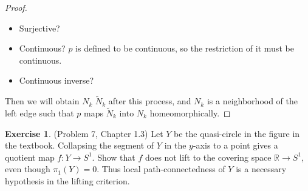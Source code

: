\documentclass[12pt, psamsfonts]{amsart}
\theoremstyle{definition}
\newtheorem*{exer}{Exercise}
\theoremstyle{remark}
\numberwithin{equation}{section}
\begin{document}
\begin{proof}
\begin{itemize}
\begin{figure}
        \caption{Problem 5(Injectivity)}
        \label{fig:problem5_injective}
      \end{figure}
      $c$ and $p(\tilde{a})$ are path connected in $N_i$, and $c$ and $p(\tilde{b})$ are path connected in $V_{i + 1}$.
      Thus $\tilde{c}$ and $\tilde{a}$ are path connected in $\tilde{N}_i$ and $\tilde{c}$ and $\tilde{b}$ are path connected in $\tilde{V}_{i + 1}$.
      Consider the path $\gamma$ from $\tilde{a}$ to $\tilde{b}$ formed by the two paths to $\tilde{c}$.
      A small neighborhood of $\tilde{c}$ is mapped homeomorphically to a neighborhood of $c$.
      However, this implies that one of $p(\tilde{a})$ or $p(\tilde{b})$ will be located above $c$ and the other one will be located below $c$.
      This is a contradiction because $p(\tilde{a}) = p(\tilde{b})$.
    \item
      Surjective?
      \todo[inline]{
      }
    \item
      Continuous?
      $p$ is defined to be continuous, so the restriction of it must be continuous.
    \item
      Continuous inverse?
      \todo[inline]{
      }
  \end{itemize}

  Then we will obtain $N_k$ $\tilde{N}_k$ after this process, and $N_k$ is a neighborhood of the left edge such that $p$ maps $\tilde{N}_k$ into $N_k$ homeomorphically.
\end{proof}

\begin{exer}{(Problem 7, Chapter 1.3)}
  Let $Y$ be the quasi-circle in the figure in the textbook.
  Collapsing the segment of $Y$ in the $y$-axis to a point gives a quotient map $f: Y \rightarrow S^1$.
  Show that $f$ does not lift to the covering space $\mathbb{R} \rightarrow S^1$, even though $\pi_1(Y) = 0$.
  Thus local path-connectedness of $Y$ is a necessary hypothesis in the lifting criterion.
\end{exer}
\end{document}
